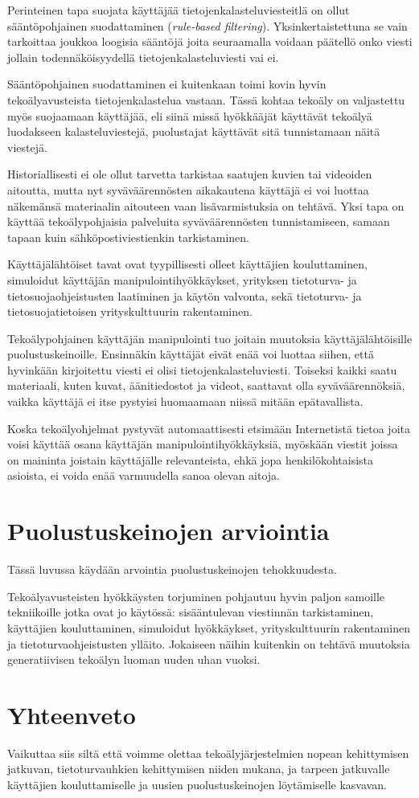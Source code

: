 Perinteinen tapa suojata käyttäjää tietojenkalasteluviesteitlä on ollut sääntöpohjainen suodattaminen (\textit{rule-based filtering}). Yksinkertaistettuna se vain tarkoittaa joukkoa loogisia sääntöjä joita seuraamalla voidaan päätellö onko viesti jollain todennäköisyydellä tietojenkalasteluviesti vai ei.

Sääntöpohjainen suodattaminen ei kuitenkaan toimi kovin hyvin tekoälyavusteista tietojenkalastelua vastaan. Tässä kohtaa tekoäly on valjastettu myös suojaamaan käyttäjää, eli siinä missä hyökkääjät käyttävät tekoälyä luodakseen kalasteluviestejä, puolustajat käyttävät sitä tunnistamaan näitä viestejä.

Historiallisesti ei ole ollut tarvetta tarkistaa saatujen kuvien tai videoiden aitoutta, mutta nyt syväväärennösten aikakautena käyttäjä ei voi luottaa näkemänsä materiaalin aitouteen vaan lisävarmistuksia on tehtävä. Yksi tapa on käyttää tekoälypohjaisia palveluita syväväärennösten tunnistamiseen, samaan tapaan kuin sähköpostiviestienkin tarkistaminen.

Käyttäjälähtöiset tavat ovat tyypillisesti olleet käyttäjien kouluttaminen, simuloidut käyttäjän manipulointihyökkäykset, yrityksen tietoturva- ja tietosuojaohjeistusten laatiminen ja käytön valvonta, sekä tietoturva- ja tietosuojatietoisen yrityskulttuurin rakentaminen.

Tekoälypohjainen käyttäjän manipulointi tuo joitain muutoksia käyttäjälähtöisille puolustuskeinoille. Ensinnäkin käyttäjät eivät enää voi luottaa siihen, että hyvinkään kirjoitettu viesti ei olisi tietojenkalasteluviesti. Toiseksi kaikki saatu materiaali, kuten kuvat, äänitiedostot ja videot, saattavat olla syväväärennöksiä, vaikka käyttäjä ei itse pystyisi huomaamaan niissä mitään epätavallista.

Koska tekoälyohjelmat pystyvät automaattisesti etsimään Internetistä tietoa joita voisi käyttää osana käyttäjän manipulointihyökkäyksiä, myöskään viestit joissa on maininta joistain käyttäjälle relevanteista, ehkä jopa henkilökohtaisista asioista, ei voida enää varmuudella sanoa olevan aitoja.

\section*{Puolustuskeinojen arviointia}

Tässä luvussa käydään arvointia puolustuskeinojen tehokkuudesta.

Tekoälyavusteisten hyökkäysten torjuminen pohjautuu hyvin paljon samoille tekniikoille jotka ovat jo käytössä: sisääntulevan viestinnän tarkistaminen, käyttäjien kouluttaminen, simuloidut hyökkäykset, yrityskulttuurin rakentaminen ja tietoturvaohjeistusten ylläito. Jokaiseen näihin kuitenkin on tehtävä muutoksia generatiivisen tekoälyn luoman uuden uhan vuoksi.


\section*{Yhteenveto}

Vaikuttaa siis siltä että voimme olettaa tekoälyjärjestelmien nopean kehittymisen jatkuvan, tietoturvauhkien kehittymisen niiden mukana, ja tarpeen jatkuvalle käyttäjien kouluttamiselle ja uusien puolustuskeinojen löytämiselle kasvavan.